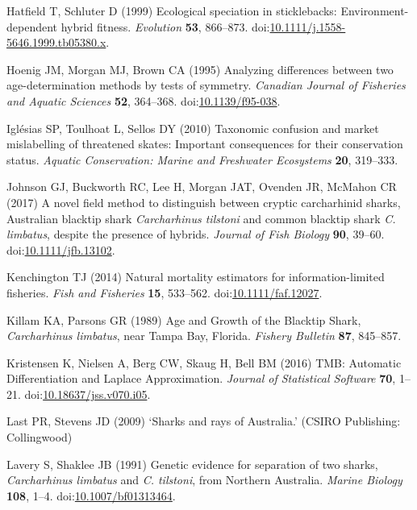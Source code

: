 \documentclass[]{article}
\begin{document}
\hypertarget{ref-hatfield_ecological_1999}{}
Hatfield T, Schluter D (1999) Ecological speciation in sticklebacks:
Environment-dependent hybrid fitness. \emph{Evolution} \textbf{53},
866--873.
doi:\href{https://doi.org/10.1111/j.1558-5646.1999.tb05380.x}{10.1111/j.1558-5646.1999.tb05380.x}.

\hypertarget{ref-hoenig_analyzing_1995}{}
Hoenig JM, Morgan MJ, Brown CA (1995) Analyzing differences between two
age-determination methods by tests of symmetry. \emph{Canadian Journal
of Fisheries and Aquatic Sciences} \textbf{52}, 364--368.
doi:\href{https://doi.org/10.1139/f95-038}{10.1139/f95-038}.

\hypertarget{ref-iglesias_taxonomic_2010}{}
Iglésias SP, Toulhoat L, Sellos DY (2010) Taxonomic confusion and market
mislabelling of threatened skates: Important consequences for their
conservation status. \emph{Aquatic Conservation: Marine and Freshwater
Ecosystems} \textbf{20}, 319--333.

\hypertarget{ref-johnson_novel_2017}{}
Johnson GJ, Buckworth RC, Lee H, Morgan JAT, Ovenden JR, McMahon CR
(2017) A novel field method to distinguish between cryptic carcharhinid
sharks, Australian blacktip shark \emph{Carcharhinus tilstoni} and
common blacktip shark \emph{C. limbatus}, despite the presence of
hybrids. \emph{Journal of Fish Biology} \textbf{90}, 39--60.
doi:\href{https://doi.org/10.1111/jfb.13102}{10.1111/jfb.13102}.

\hypertarget{ref-kenchington_natural_2014}{}
Kenchington TJ (2014) Natural mortality estimators for
information-limited fisheries. \emph{Fish and Fisheries} \textbf{15},
533--562.
doi:\href{https://doi.org/10.1111/faf.12027}{10.1111/faf.12027}.

\hypertarget{ref-killam_age_1989}{}
Killam KA, Parsons GR (1989) Age and Growth of the Blacktip Shark,
\emph{Carcharhinus limbatus}, near Tampa Bay, Florida. \emph{Fishery
Bulletin} \textbf{87}, 845--857.

\hypertarget{ref-kristensen_tmb:_2016}{}
Kristensen K, Nielsen A, Berg CW, Skaug H, Bell BM (2016) TMB: Automatic
Differentiation and Laplace Approximation. \emph{Journal of Statistical
Software} \textbf{70}, 1--21.
doi:\href{https://doi.org/10.18637/jss.v070.i05}{10.18637/jss.v070.i05}.

\hypertarget{ref-last_sharks_2009}{}
Last PR, Stevens JD (2009) `Sharks and rays of Australia.' (CSIRO
Publishing: Collingwood)

\hypertarget{ref-lavery_genetic_1991}{}
Lavery S, Shaklee JB (1991) Genetic evidence for separation of two
sharks, \emph{Carcharhinus limbatus} and \emph{C. tilstoni}, from
Northern Australia. \emph{Marine Biology} \textbf{108}, 1--4.
doi:\href{https://doi.org/10.1007/bf01313464}{10.1007/bf01313464}.
\end{document}
